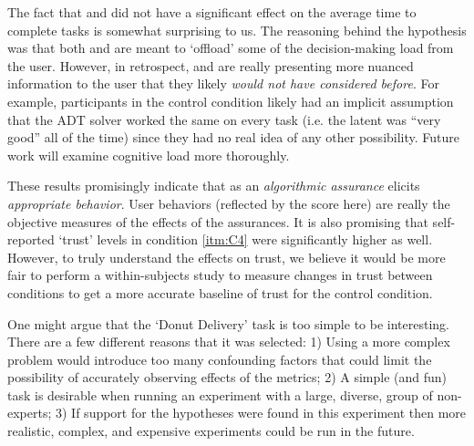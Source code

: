 The fact that \xQ{} and \xO{} did not have a significant effect on the average time to complete tasks is somewhat surprising to us. The reasoning behind the hypothesis was that both \xQ{} and \xO{} are meant to `offload' some of the decision-making load from the user. However, in retrospect, \xQ{} and \xO{} are really presenting more nuanced information to the user that they likely \emph{would not have considered before}. For example, participants in the control condition likely had an implicit assumption that the ADT solver worked the same on every task (i.e. the latent \xQ{} was ``very good'' all of the time) since they had no real idea of any other possibility. 
Future work will examine cognitive load more thoroughly. 

These results promisingly indicate that \famsec{} as an \emph{algorithmic assurance} elicits \emph{appropriate behavior}. User behaviors (reflected by the score here) are really the objective measures of the effects of the assurances. It is also promising that self-reported `trust' levels in condition \ref{itm:C4} were significantly higher as well. However, to truly understand the effects on trust, we believe it would be more fair to perform a within-subjects study to measure changes in trust between conditions to get a more accurate baseline of trust for the control condition.

One might argue that the `Donut Delivery' task is too simple to be interesting. There are a few different reasons that it was selected: 1) Using a more complex problem would introduce too many confounding factors that could limit the possibility of accurately observing effects of the \famsec{} metrics; 2) A simple (and fun) task is desirable when running an experiment with a large, diverse, group of non-experts; 3) If support for the hypotheses were found in this experiment then more realistic, complex, and expensive experiments could be run in the future.

%
